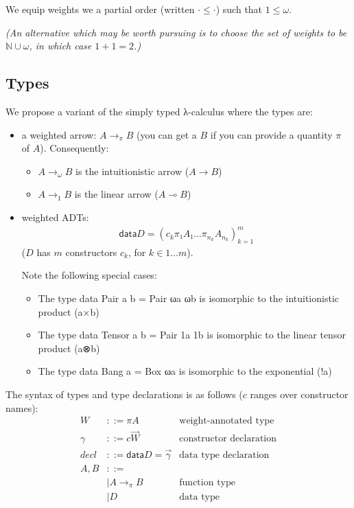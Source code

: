 \documentclass[11pt]{article}
\begin{document}
We equip weights we a partial order (written \(· ≤ ·\)) such that \(1 ≤ ω\).

\emph{(An alternative which may be worth pursuing is to choose the set of
weights to be \(ℕ∪{ω}\), in which case \(1+1=2\).)}

\subsection{Types}
\label{sec:orgheadline2}

We propose a variant of the simply typed λ-calculus where the types
are:

\begin{itemize}
\item a weighted arrow: \(A →_π B\) (you can get a \(B\) if you can provide a
quantity \(π\) of \(A\)). Consequently:
\begin{itemize}
\item \(A →_ω B\) is the intuitionistic arrow (\(A → B\))
\item \(A →_1 B\) is the linear arrow (\(A ⊸ B\))
\end{itemize}
\item weighted ADTs:
\begin{align*}
\mathsf{data} D = \left(c_k  π₁ A₁  …  π_{n_k} A_{n_k}\right)^m_{k=1}
\end{align*}
(\(D\) has \(m\) constructors \(c_k\), for \(k ∈ 1…m\)).

Note the following special cases:
\begin{itemize}
\item The type data Pair a b = Pair ωa ωb is isomorphic to the intuitionistic product (a×b)
\item The type data Tensor a b = Pair 1a 1b is isomorphic to the linear tensor product (a⊗b)
\item The type data Bang a = Box ωa is isomorphic to the exponential (!a)
\end{itemize}
\end{itemize}

The syntax of types and type declarations is as follows ($c$ ranges over constructor names):
\begin{align*}
  W &::= πA &\text{weight-annotated type}\\
  γ &::= c  \vec{W}&\text{constructor declaration}\\
  decl &::= \mathsf{data } D = \vec{γ}&\text{data type declaration}\\
  A,B &::=\\
      & |  A →_π B &\text{function type}\\
      & |  D &\text{data type}
\end{align*}
\end{document}
